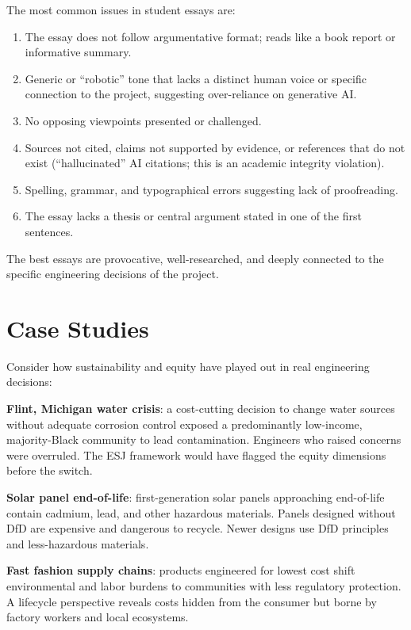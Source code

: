 \begin{warningbox}
The most common issues in student essays are:
\begin{enumerate}[nosep,leftmargin=1.5em]
\item The essay does not follow argumentative format; reads like a book report or informative summary.
\item Generic or ``robotic'' tone that lacks a distinct human voice or specific connection to the project, suggesting over-reliance on generative AI.
\item No opposing viewpoints presented or challenged.
\item Sources not cited, claims not supported by evidence, or references that do not exist (``hallucinated'' AI citations; this is an academic integrity violation).
\item Spelling, grammar, and typographical errors suggesting lack of proofreading.
\item The essay lacks a thesis or central argument stated in one of the first sentences.
\end{enumerate}
The best essays are provocative, well-researched, and deeply connected to the specific engineering decisions of the project.
\end{warningbox}

\section{Case Studies}
Consider how sustainability and equity have played out in real engineering decisions:

\textbf{Flint, Michigan water crisis}: a cost-cutting decision to change water sources without adequate corrosion control exposed a predominantly low-income, majority-Black community to lead contamination. Engineers who raised concerns were overruled. The ESJ framework would have flagged the equity dimensions before the switch.

\textbf{Solar panel end-of-life}: first-generation solar panels approaching end-of-life contain cadmium, lead, and other hazardous materials. Panels designed without DfD are expensive and dangerous to recycle. Newer designs use DfD principles and less-hazardous materials.

\textbf{Fast fashion supply chains}: products engineered for lowest cost shift environmental and labor burdens to communities with less regulatory protection. A lifecycle perspective reveals costs hidden from the consumer but borne by factory workers and local ecosystems.

